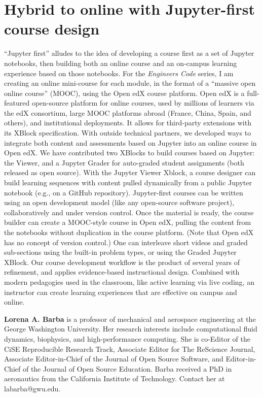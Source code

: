 \documentclass[10pt,journal,compsoc]{IEEEtran}
\begin{document}
\section{Hybrid to online with Jupyter-first course design}

``Jupyter first'' alludes to the idea of developing a course first as a set of Jupyter notebooks, then building both an online course and an on-campus learning experience based on those notebooks. 
For the \emph{Engineers Code} series, I am creating an online mini-course for each module,  in the format of a ``massive open online course'' (MOOC), using the Open edX course platform. 
Open edX is a full-featured open-source platform for online courses, used by millions of learners via the edX consortium, large MOOC platforms abroad (France, China, Spain, and others), and institutional deployments. 
It allows for third-party extensions with its XBlock specification. 
With outside technical partners, we developed ways to integrate both content and assessments based on Jupyter into an online course in Open edX. 
We have contributed two XBlocks to build courses based on Jupyter: the Viewer, and a Jupyter Grader for auto-graded student assignments (both released as open source). 
With the Jupyter Viewer Xblock, a course designer can build learning sequences with content pulled dynamically from a public Jupyter notebook (e.g., on a GitHub repository). 
Jupyter-first courses can be written using an open development model (like any open-source software project), collaboratively and under version control. 
Once the material is ready, the course builder can create a MOOC-style course in Open edX, pulling the content from the notebooks without duplication in the course platform. 
(Note that Open edX has no concept of version control.) 
One can interleave short videos and graded sub-sections using the built-in problem types, or using the Graded Jupyter XBlock. 
Our course development workflow is the product of several years of refinement, and applies evidence-based instructional design. 
Combined with modern pedagogies used in the classroom, like active learning via live coding, an instructor can create learning experiences that are effective on campus and online. 


\bigskip

\textbf{Lorena A. Barba} is a professor of mechanical and aerospace engineering at the George Washington University. Her research interests include computational fluid dynamics, biophysics, and high-performance computing. She is co-Editor of the CiSE Reproducible Research Track, Associate Editor for The ReScience Journal, Associate Editor-in-Chief of the Journal of Open Source Software, and Editor-in-Chief of the Journal of Open Source Education. Barba received a PhD in aeronautics from the California Institute of Technology. Contact her at labarba@gwu.edu.



%
\end{document}
